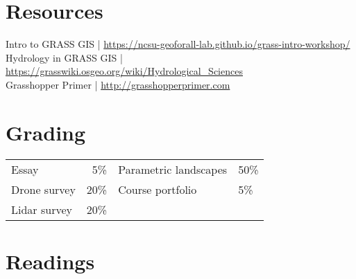 \documentclass[11pt,article,oneside]{memoir}
\begin{document}
\section{Resources}
Intro to GRASS GIS | \url{https://ncsu-geoforall-lab.github.io/grass-intro-workshop/}\\
Hydrology in GRASS GIS | \url{https://grasswiki.osgeo.org/wiki/Hydrological_Sciences}\\
Grasshopper Primer | \url{http://grasshopperprimer.com}\\


\section{Grading}
%
\begin{table}[H]
\begin{tabular}{l r @{\hskip 2cm} l @{\hskip 0.5cm} l}
%
Essay & 5\% & Parametric landscapes & 50\% \\
Drone survey & 20\% & Course portfolio & 5\% \\
Lidar survey & 20\% \\
%
\end{tabular}
\end{table}

\section{Readings}
\vspace*{0.5cm}
\nocite{*}
\setlength{}
\printbibliography[heading=none]
\clearpage
\end{document}
